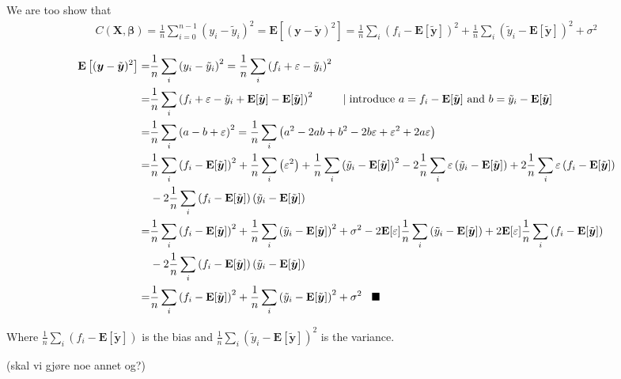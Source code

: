 \documentclass[a4paper,10pt,english]{article}
\begin{document}
We are too show that 
\begin{align}
C(\boldsymbol{X}, \boldsymbol{\beta})=\frac{1}{n} \sum_{i=0}^{n-1}\left(y_{i}-\tilde{y}_{i}\right)^{2}
= \mathbf{E}\left[(\boldsymbol{y}-\tilde{\boldsymbol{y}})^{2}\right]
=\frac{1}{n} \sum_{i}\left(f_{i}-\mathbf{E}[\tilde{\boldsymbol{y}}]\right)^{2}+\frac{1}{n} \sum_{i}\left(\tilde{y}_{i}-\mathbf{E}[\tilde{\boldsymbol{y}}]\right)^{2}+\sigma^{2}
\end{align}

\begin{align}
\mathbf{E}\left[(\boldsymbol{y}-\tilde{\boldsymbol{y}})^{2}\right] 
=& \frac{1}{n} \sum_{i} \left( y_i - \tilde{y}_i \right)^2
= \frac{1}{n} \sum_{i} \left( f_i + \varepsilon - \tilde{y}_i \right)^2 \\
=& \frac{1}{n} \sum_{i} \left( f_i + \varepsilon - \tilde{y}_i  + \mathbf{E}[\tilde{\boldsymbol{y}}] - \mathbf{E}[\tilde{\boldsymbol{y}}] \right)^2 \hspace{0.9cm} 
| \hspace{0.1cm} \text{introduce $a = f_i - \mathbf{E}[\tilde{\boldsymbol{y}}] $ and $b = \tilde{y}_i - \mathbf{E}[\tilde{\boldsymbol{y}}]$}\\
=& \frac{1}{n} \sum_{i} \left( a - b + \varepsilon \right)^2
= \frac{1}{n} \sum_{i} \left( a^2 - 2ab + b^2 - 2b\varepsilon + \varepsilon^2 + 2a\varepsilon \right)\\
=& \frac{1}{n} \sum_{i} \left( f_i - \mathbf{E}[\tilde{\boldsymbol{y}}] \right)^2 
+ \frac{1}{n} \sum_{i} \left( \varepsilon^2 \right)
+ \frac{1}{n} \sum_{i} \left( \tilde{y}_i - \mathbf{E}[\tilde{\boldsymbol{y}}] \right)^2 
- 2\frac{1}{n} \sum_{i} \varepsilon \left( \tilde{y}_i - \mathbf{E}[\tilde{\boldsymbol{y}}] \right)
+ 2\frac{1}{n} \sum_{i} \varepsilon \left( f_i - \mathbf{E}[\tilde{\boldsymbol{y}}] \right)\\
&- 2\frac{1}{n} \sum_{i} \left( f_i - \mathbf{E}[\tilde{\boldsymbol{y}}] \right) \left( \tilde{y}_i - \mathbf{E}[\tilde{\boldsymbol{y}}] \right)\\
=& \frac{1}{n} \sum_{i} \left( f_i - \mathbf{E}[\tilde{\boldsymbol{y}}] \right)^2 
+ \frac{1}{n} \sum_{i} \left( \tilde{y}_i - \mathbf{E}[\tilde{\boldsymbol{y}}] \right)^2 
+ \sigma^2
- 2 \mathbf{E}[\varepsilon] \frac{1}{n} \sum_{i} \left( \tilde{y}_i - \mathbf{E}[\tilde{\boldsymbol{y}}] \right)
+ 2 \mathbf{E}[\varepsilon] \frac{1}{n} \sum_{i} \left( f_i - \mathbf{E}[\tilde{\boldsymbol{y}}] \right)\\
&- 2\frac{1}{n} \sum_{i} \left( f_i - \mathbf{E}[\tilde{\boldsymbol{y}}] \right) \left( \tilde{y}_i - \mathbf{E}[\tilde{\boldsymbol{y}}] \right)\\
=& \frac{1}{n} \sum_{i} \left( f_i - \mathbf{E}[\tilde{\boldsymbol{y}}] \right)^2 
+ \frac{1}{n} \sum_{i} \left( \tilde{y}_i - \mathbf{E}[\tilde{\boldsymbol{y}}] \right)^2 
+ \sigma^2 \hspace{0.3cm} \blacksquare
\end{align}

Where $\frac{1}{n} \sum_{i} \left( f_i - \mathbf{E}[\tilde{\boldsymbol{y}}] \right)$ is the bias and
$\frac{1}{n} \sum_{i} \left( \tilde{y}_i - \mathbf{E}[\tilde{\boldsymbol{y}}] \right)^2$ is the variance. 

(skal vi gjøre noe annet og?)
\end{document}
